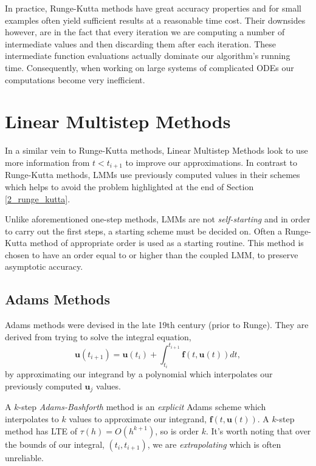 \documentclass[12pt, twoside]{report}
\theoremstyle{plain}
\theoremstyle{definition}
\theoremstyle{definition}
\begin{document}
            In practice, Runge-Kutta methods have great accuracy properties
            and for small examples often yield sufficient results at a 
            reasonable time cost. Their downsides however, are in the fact
            that every iteration we are computing a number of intermediate
            values and then discarding them after each iteration. These 
            intermediate function evaluations actually dominate our 
            algorithm's running time. Consequently, when working on large 
            systems of complicated ODEs our computations become very 
            inefficient. 

    \section{Linear Multistep Methods}
    \label{2_lmms}
        In a similar vein to Runge-Kutta methods, Linear Multistep Methods 
        look to use more information from $t<t_{i+1}$ to improve our 
        approximations. In contrast to Runge-Kutta methods, LMMs use 
        previously computed values in their schemes which helps to avoid the problem highlighted at the end of Section \ref{2_runge_kutta}.

        Unlike aforementioned one-step methods, LMMs are not 
        \textit{self-starting} and in order to carry out the first steps, a 
        starting scheme must be decided on. Often a Runge-Kutta method of
        appropriate order is used as a starting routine. This method is chosen
        to have an order equal to or higher than the coupled LMM, to preserve
        asymptotic accuracy.

        \subsection{Adams Methods}
        \label{2_adams}
            Adams methods were devised in the late 19th century (prior to 
            Runge). They are derived from trying to solve the integral 
            equation,
            \begin{equation}
            \label{2_int_equation}
                \mathbf{u}(t_{i+1}) = \mathbf{u}(t_i) + \int_{t_i}^{t_{i+1}}
                \mathbf{f}(t, \mathbf{u}(t)) dt,
            \end{equation}
            by approximating our integrand by a polynomial which interpolates
            our previously computed $\mathbf{u}_j$ values.

            A $k$-step \textit{Adams-Bashforth} method is an \textit{explicit}
            Adams scheme which interpolates to $k$ values to approximate 
            our integrand, $\mathbf{f}(t, \mathbf{u}(t))$. A $k$-step method 
            has LTE of $\tau(h)=O(h^{k+1})$, so is order $k$. It's worth 
            noting that over the bounds of our integral, $(t_i, t_{i+1})$, we 
            are \textit{extrapolating} which is often unreliable.
\end{document}
